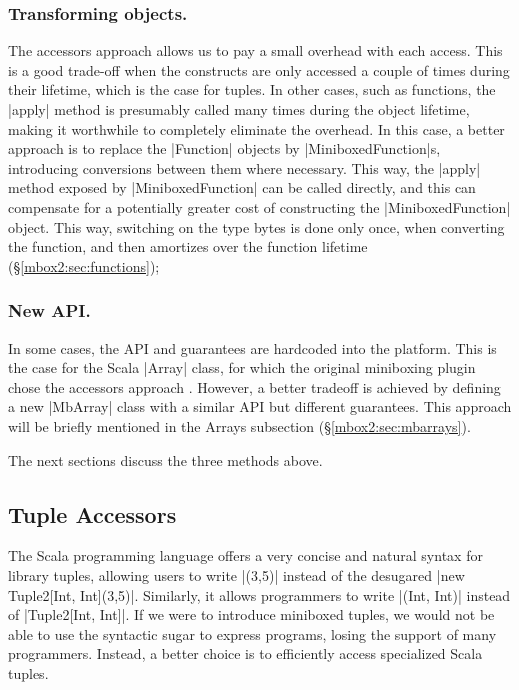 \subsubsection*{Transforming objects.} The accessors approach allows us to pay a small overhead with each access. This is a good trade-off when the constructs are only accessed a couple of times during their lifetime, which is the case for tuples. In other cases, such as functions, the |apply| method is presumably called many times during the object lifetime, making it worthwhile to completely eliminate the overhead. In this case, a better approach is to replace the |Function| objects by |MiniboxedFunction|s, introducing conversions between them where necessary. This way, the |apply| method exposed by |MiniboxedFunction| can be called directly, and this can compensate for a potentially greater cost of constructing the |MiniboxedFunction| object. This way, switching on the type bytes is done only once, when converting the function, and then amortizes over the function lifetime (\S\ref{mbox2:sec:functions});



\subsubsection*{New API.} In some cases, the API and guarantees are hardcoded into the platform. This is the case for the Scala |Array| class, for which the original miniboxing plugin chose the accessors approach \cite{miniboxing}. However, a better tradeoff is achieved by defining a new |MbArray| class with a similar API but different guarantees. This approach will be briefly mentioned in the Arrays subsection (\S\ref{mbox2:sec:mbarrays}).

The next sections discuss the three methods above.



\subsection{Tuple Accessors}
\label{mbox2:sec:tuples}



The Scala programming language offers a very concise and natural syntax for library tuples, allowing users to write |(3,5)| instead of the desugared |new Tuple2[Int, Int](3,5)|. Similarly, it allows programmers to write |(Int, Int)| instead of |Tuple2[Int, Int]|. If we were to introduce miniboxed tuples, we would not be able to use the syntactic sugar to express programs, losing the support of many programmers. Instead, a better choice is to efficiently access specialized Scala tuples.

